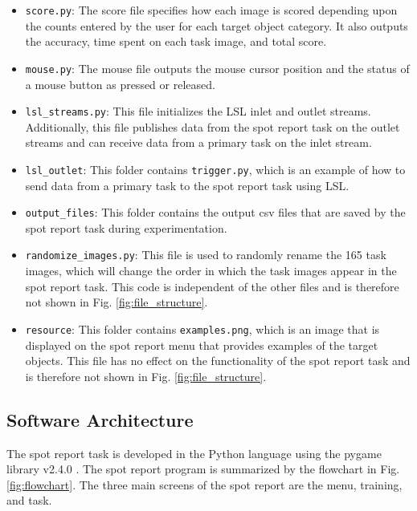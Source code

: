 \documentclass[preprint,12pt, a4paper]{elsarticle}
\begin{document}
\begin{itemize}
    \item \texttt{score.py}: The score file specifies how each image is scored depending upon the counts entered by the user for each target object category. It also outputs the accuracy, time spent on each task image, and total score.

    \item \texttt{mouse.py}: The mouse file outputs the mouse cursor position and the status of a mouse button as pressed or released.

    \item \texttt{lsl\_streams.py}: This file initializes the LSL inlet and outlet streams. Additionally, this file publishes data from the spot report task on the outlet streams and can receive data from a primary task on the inlet stream.

    \item \texttt{lsl\_outlet}: This folder contains \texttt{trigger.py}, which is an example of how to send data from a primary task to the spot report task using LSL.

    \item \texttt{output\_files}: This folder contains the output csv files that are saved by the spot report task during experimentation.
    
    \item \texttt{randomize\_images.py}: This file is used to randomly rename the 165 task images, which will change the order in which the task images appear in the spot report task. This code is independent of the other files and is therefore not shown in Fig. \ref{fig:file_structure}.

    \item \texttt{resource}: This folder contains \texttt{examples.png}, which is an image that is displayed on the spot report menu that provides examples of the target objects. This file has no effect on the functionality of the spot report task and is therefore not shown in Fig. \ref{fig:file_structure}.
\end{itemize}


\subsection{Software Architecture}
The spot report task is developed in the Python language \cite{vanPython} using the pygame library v2.4.0 {\cite{sweigart2012making}}. The spot report program is summarized by the flowchart in Fig. \ref{fig:flowchart}. The three main screens of the spot report are the menu, training, and task.
\end{document}
